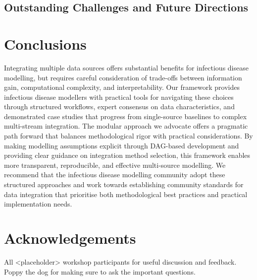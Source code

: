 \documentclass{article}
\begin{document}
\subsection{Outstanding Challenges and Future Directions}

\section{Conclusions}

Integrating multiple data sources offers substantial benefits for infectious disease modelling, but requires careful consideration of trade-offs between information gain, computational complexity, and interpretability.
Our framework provides infectious disease modellers with practical tools for navigating these choices through structured workflows, expert consensus on data characteristics, and demonstrated case studies that progress from single-source baselines to complex multi-stream integration.
The modular approach we advocate offers a pragmatic path forward that balances methodological rigor with practical considerations.
By making modelling assumptions explicit through DAG-based development and providing clear guidance on integration method selection, this framework enables more transparent, reproducible, and effective multi-source modelling.
We recommend that the infectious disease modelling community adopt these structured approaches and work towards establishing community standards for data integration that prioritise both methodological best practices and practical implementation needs.

\section{Acknowledgements}

All <placeholder> workshop participants for useful discussion and feedback. Poppy the dog for making sure to ask the important questions.



\end{document}
